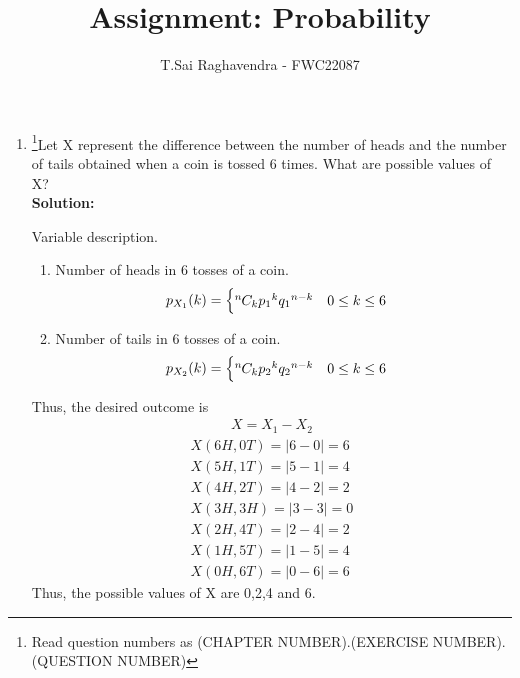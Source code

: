 \documentclass{article}
\newcommand*{\permcomb}[4][0mu]{{{}^{#3}\mkern#1#2_{#4}}}
\newcommand*{\comb}[1][-1mu]{\permcomb[#1]{C}}
\newcommand{\solution}{\noindent \textbf{Solution: }}
\begin{document}
\title{Assignment: Probability}
\author{\Large T.Sai Raghavendra - FWC22087}
\date{}


\maketitle
\begin{enumerate}[label=13.\arabic{enumi}.\arabic{enumii}]%
\setcounter{enumi}{3}
\setcounter{enumii}{3}

\item \footnote{Read question numbers as (CHAPTER NUMBER).(EXERCISE NUMBER).(QUESTION NUMBER)}Let X represent the difference between the number of heads and the number of tails obtained when a coin is tossed 6 times. What are possible values of X?\\

\solution

	\begin{table}[h]
	\centering
	
	\caption{Variable description.}
	\label{tables:table1}
	\end{table}
	
\begin{enumerate}
\item Number of heads in 6 tosses of a coin.
\begin{align}
p_{X_1}(k) &= 
\begin{cases}
\comb{n}{k}{p_1}^{k}{q_1}^{n-k} & 0 \le k \le 6\\               
\end{cases}
\end{align}
	
\item Number of tails in 6 tosses of a coin.
\begin{align}
p_{X_2}(k) &= 
\begin{cases}
\comb{n}{k}{p_2}^{k}{q_2}^{n-k} & 0 \le k \le 6\\              
\end{cases}
\end{align}
\end{enumerate}
Thus, the desired outcome is\\
\begin{align}
X = X_1 - X_2
\end{align}
\begin{align}
X(6H,0T) = |6-0| = 6\\
X(5H,1T) = |5-1| = 4\\
X(4H,2T) = |4-2| = 2\\
X(3H,3H) = |3-3| = 0\\
X(2H,4T) = |2-4| = 2\\
X(1H,5T) = |1-5| = 4\\
X(0H,6T) = |0-6| = 6
\end{align}
Thus, the possible values of X are 0,2,4 and 6.
\end{enumerate}
\end{document}
